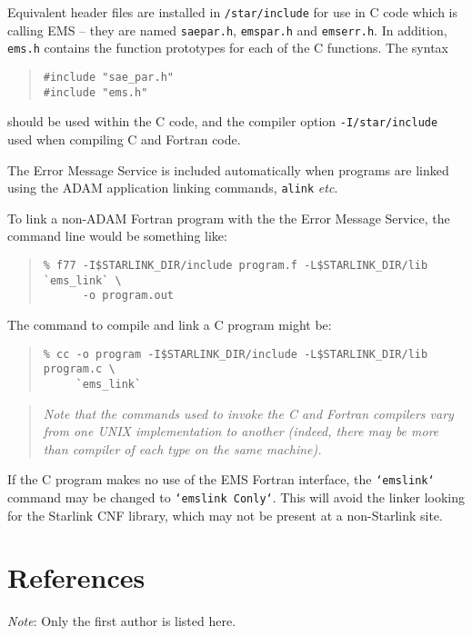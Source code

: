 \documentclass[twoside,11pt]{article}
\newcommand{\xref}[3]{#1}
\newcommand{\xlabel}[1]{}
\renewcommand{\_}{\texttt{\symbol{95}}}
\begin{document}
Equivalent header files are installed in \texttt{/star/include} for use in C
code which is calling EMS -- they are named \texttt{sae\_par.h},
\texttt{ems\_par.h} and \texttt{ems\_err.h}.
In addition, \texttt{ems.h} contains the function prototypes for each of the C 
functions.
The syntax
\begin{quote}
\begin{verbatim}
#include "sae_par.h"
#include "ems.h"
\end{verbatim}
\end{quote}
should be used within the C code, and the compiler option
\texttt{-I/star/include} used when compiling C and Fortran code.

The Error Message Service is included automatically when
programs are linked using the ADAM application linking commands,
\texttt{alink} \textit{etc}.

To link a non-ADAM Fortran program with the the Error Message Service, the
command line would be something like:
\begin {quote}
\begin{verbatim}
% f77 -I$STARLINK_DIR/include program.f -L$STARLINK_DIR/lib `ems_link` \
      -o program.out
\end{verbatim}
\end {quote}

The command to compile and link a C program might be:
\begin {quote}
\begin{verbatim}
% cc -o program -I$STARLINK_DIR/include -L$STARLINK_DIR/lib program.c \
     `ems_link`
\end{verbatim}
\end {quote}

\begin {quote}
\emph{Note that the commands used to invoke the C and Fortran compilers vary
from one UNIX implementation to another (indeed, there may be more than
compiler of each type on the same machine).}
\end {quote}

If the C program makes no use of the EMS Fortran interface, the
\texttt{`ems\_link`} command may be changed to \texttt{`ems\_link Conly`}.
This will avoid the linker looking for the Starlink
\xref{CNF}{sun209}{}
library, which may not be present at a non-Starlink site.

\section{\xlabel{references}References}
\emph{Note}: Only the first author is listed here.
\end{document}

